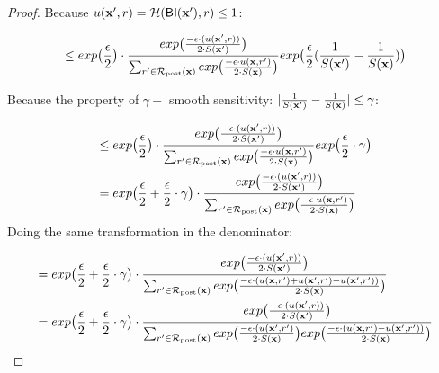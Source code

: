 \documentclass{article}
\begin{document}
\begin{proof}
  Because $u(\textbf{x}', {r}) = \mathcal{H}(\mathsf{BI}(\textbf{x}'), r) \leq 1$:

  \begin{equation*}
  \begin{split}
  & \leq exp\big( \frac{\epsilon}{2} \big) \cdot 
  \frac {
  exp
  \big(
  \frac{-\epsilon\cdot(u(\textbf{x}', {r}))}{2\cdot S(\textbf{x}')}
  \big)
  } 
  {\sum_{r'\in \mathcal{R}_{\textup{post}}(\textbf{x})} exp \big(\frac{-\epsilon\cdot u(\textbf{\textbf{x}}, r')}{2 \cdot S(\textbf{x})}\big)}
  exp
  \big(
  \frac{\epsilon}{2}(\frac{1}{S(\textbf{x}')} - \frac{1}{S(\textbf{x})})
  \big)\\
  \end{split}
  \end{equation*}

  Because the property of $\gamma -$ smooth sensitivity: $|\frac{1}{S(\textbf{x}')} - \frac{1}{S(\textbf{x})}| \leq \gamma$:
  
  \begin{equation*}
  \begin{split}
  & \leq exp\big( \frac{\epsilon}{2} \big) \cdot 
  \frac {
  exp
  \big(
  \frac{-\epsilon\cdot(u(\textbf{x}', {r}))}{2\cdot S(\textbf{x}')}
  \big)
  } 
  {\sum_{r'\in \mathcal{R}_{\textup{post}}(\textbf{x})} exp \big(\frac{-\epsilon\cdot u(\textbf{\textbf{x}}, r')}{2 \cdot S(\textbf{x})}\big)}
  exp
  \big(
  \frac{\epsilon}{2} \cdot \gamma
  \big)\\
  & = exp\big( \frac{\epsilon}{2} + \frac{\epsilon}{2} \cdot \gamma\big) \cdot 
  \frac {
  exp
  \big(
  \frac{-\epsilon\cdot(u(\textbf{x}', {r}))}{2\cdot S(\textbf{x}')}
  \big)
  } 
  {\sum_{r'\in \mathcal{R}_{\textup{post}}(\textbf{x})} exp \big(\frac{-\epsilon\cdot u(\textbf{\textbf{x}}, r')}{2 \cdot S(\textbf{x})}\big)}\\
  \end{split}
  \end{equation*}
  Doing the same transformation in the denominator:

  \begin{equation*}
  \begin{split}
  & = exp\big( \frac{\epsilon}{2} + \frac{\epsilon}{2} \cdot \gamma\big) \cdot 
  \frac {
  exp
  \big(
  \frac{-\epsilon\cdot(u(\textbf{x}', {r}))}{2\cdot S(\textbf{x}')}
  \big)
  } 
  {
  \sum_{r'\in \mathcal{R}_{\textup{post}}(\textbf{x})} 
  exp 
  \big(
  \frac{-\epsilon\cdot(u(\textbf{x}, {r'}) + u(\textbf{x}', {r'}) - u(\textbf{x}', {r'}))}{2 \cdot S(\textbf{x})}
  \big)
  }\\
  & = exp\big( \frac{\epsilon}{2} + \frac{\epsilon}{2} \cdot \gamma\big) \cdot 
  \frac {
  exp
  \big(
  \frac{-\epsilon\cdot(u(\textbf{x}', {r}))}{2\cdot S(\textbf{x}')}
  \big)
  } 
  {
  \sum_{r'\in \mathcal{R}_{\textup{post}}(\textbf{x})} 
  exp 
  \big(
  \frac{-\epsilon\cdot(u(\textbf{x}', {r'})}{2 \cdot S(\textbf{x})}
  \big)
  exp 
  \big(
  \frac{-\epsilon\cdot(u(\textbf{x}, {r'}) - u(\textbf{x}', {r'}))}{2 \cdot S(\textbf{x})}
  \big)
  }\\
  \end{split}
  \end{equation*}


\end{proof}
\end{document}

